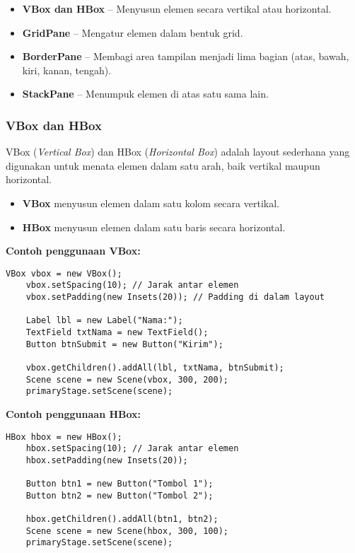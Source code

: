 \begin{itemize}
	\item \textbf{VBox dan HBox} – Menyusun elemen secara vertikal atau horizontal.
	\item \textbf{GridPane} – Mengatur elemen dalam bentuk grid.
	\item \textbf{BorderPane} – Membagi area tampilan menjadi lima bagian (atas, bawah, kiri, kanan, tengah).
	\item \textbf{StackPane} – Menumpuk elemen di atas satu sama lain.
\end{itemize}

\subsubsection{VBox dan HBox}

VBox (\textit{Vertical Box}) dan HBox (\textit{Horizontal Box}) adalah layout sederhana yang digunakan untuk menata elemen dalam satu arah, baik vertikal maupun horizontal.

\begin{itemize}
	\item \textbf{VBox} menyusun elemen dalam satu kolom secara vertikal.
	\item \textbf{HBox} menyusun elemen dalam satu baris secara horizontal.
\end{itemize}

\textbf{Contoh penggunaan VBox:}
\begin{lstlisting}[style=JavaStyle, caption=Menyusun elemen dalam VBox]
	VBox vbox = new VBox();
	vbox.setSpacing(10); // Jarak antar elemen
	vbox.setPadding(new Insets(20)); // Padding di dalam layout
	
	Label lbl = new Label("Nama:");
	TextField txtNama = new TextField();
	Button btnSubmit = new Button("Kirim");
	
	vbox.getChildren().addAll(lbl, txtNama, btnSubmit);
	Scene scene = new Scene(vbox, 300, 200);
	primaryStage.setScene(scene);
\end{lstlisting}

\textbf{Contoh penggunaan HBox:}
\begin{lstlisting}[style=JavaStyle, caption=Menyusun elemen dalam HBox]
	HBox hbox = new HBox();
	hbox.setSpacing(10); // Jarak antar elemen
	hbox.setPadding(new Insets(20));
	
	Button btn1 = new Button("Tombol 1");
	Button btn2 = new Button("Tombol 2");
	
	hbox.getChildren().addAll(btn1, btn2);
	Scene scene = new Scene(hbox, 300, 100);
	primaryStage.setScene(scene);
\end{lstlisting}

